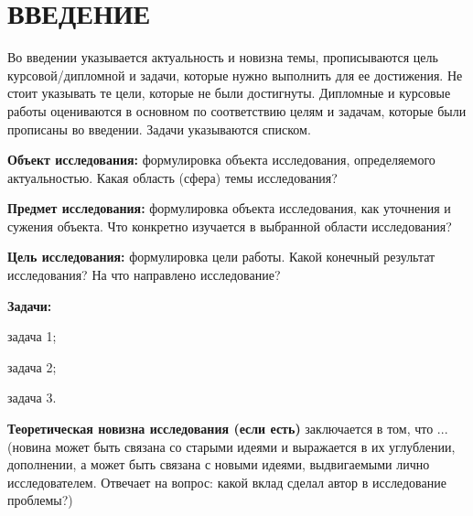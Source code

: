 \documentclass{report}
\begin{document}



\setcounter{page}{2} %
\tableofcontents  %

\setcounter{chapter}{0} %
\setcounter{section}{0} %
\setcounter{subsection}{0} %
\setcounter{equation}{0} %


\chapter*{ВВЕДЕНИЕ} %

Во введении указывается актуальность и новизна темы, прописываются цель курсовой/дипломной и задачи, которые нужно выполнить для ее достижения. Не стоит указывать те цели, которые не были достигнуты. Дипломные и курсовые работы оцениваются в основном по соответствию целям и задачам, которые были прописаны во введении. Задачи указываются списком.

{\bf Объект исследования:}  формулировка объекта исследования, определяемого актуальностью. Какая область (сфера) темы исследования?

{\bf Предмет исследования:} формулировка объекта исследования, как уточнения и сужения объекта. Что конкретно изучается в выбранной области исследования?

{\bf Цель исследования:} формулировка цели работы. Какой конечный результат исследования? На что направлено исследование?

{\bf Задачи:}
\begin{enumarabic}
\item задача 1;
\item задача 2;
\item задача 3.
\end{enumarabic}


{\bf Теоретическая новизна исследования (если есть)} заключается в том, что ... (новина может быть связана со старыми идеями и выражается в их углублении, дополнении, а может быть связана с новыми идеями, выдвигаемыми лично исследователем. Отвечает на вопрос: какой вклад сделал автор в исследование проблемы?)
\end{document}
